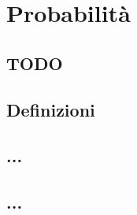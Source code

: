 
\chapter{Probabilità}

\section{TODO}

\section{Definizioni}
\label{sec:01_definizioni}

% 

\section{...}
\label{sec:02_...}

\section{...}
\label{sec:...}

